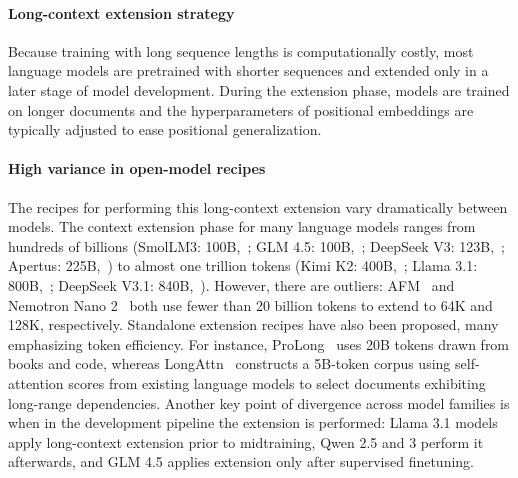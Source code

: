 \documentclass[table]{ai2style/ai2}
\begin{document}
\paragraph{Long-context extension strategy}
Because training with long sequence lengths is computationally costly, most language models are pretrained with shorter sequences and extended only in a later stage of model development.
During the extension phase, models are trained on longer documents and the hyperparameters of positional embeddings are typically adjusted to ease positional generalization.

\paragraph{High variance in open-model recipes}
The recipes for performing this long-context extension vary dramatically between models.
The context extension phase for many language models ranges from hundreds of billions (SmolLM3: 100B,~\citealt{bakouch2025smollm3}; GLM 4.5: 100B,~\citealt{glm45}; DeepSeek V3: 123B,~\citealt{deepseekv3}; Apertus: 225B,~\citealt{swissai2025apertus}) to almost one trillion tokens (Kimi K2: 400B,~\citealt{kimiK2}; Llama 3.1: 800B,~\citealt{dubey2024llama}; DeepSeek V3.1: 840B,~\citealt{deepseekV31}).
However, there are outliers: AFM~\citep{goddard2025extendingAFM} and Nemotron Nano 2~\citep{nvidia2025nvidianemotronnano2} both use fewer than 20 billion tokens to extend to 64K and 128K, respectively.
Standalone extension recipes have also been proposed, many emphasizing token efficiency. For instance, ProLong~\citep{prolong} uses 20B tokens drawn from books and code, whereas LongAttn~\citep{wu2025longattn} constructs a 5B-token corpus using self-attention scores from existing language models to select documents exhibiting long-range dependencies.
Another key point of divergence across model families is when in the development pipeline the extension is performed: Llama 3.1 models apply long-context extension prior to midtraining, Qwen 2.5 and 3 perform it afterwards, and GLM 4.5 applies extension only after supervised finetuning.
\end{document}
